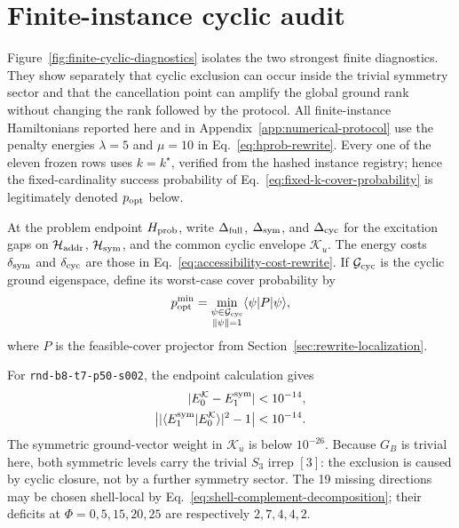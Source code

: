 

\section{Finite-instance cyclic audit}
\label{sec:numerical-reconstruction}

Figure~\ref{fig:finite-cyclic-diagnostics} isolates the two strongest finite
diagnostics.  They show separately that cyclic exclusion can occur inside
the trivial symmetry sector and that the cancellation point can amplify the
global ground rank without changing the rank followed by the protocol.
All finite-instance Hamiltonians reported here and in
Appendix~\ref{app:numerical-protocol} use the penalty energies $\lambda=5$
and $\mu=10$ in
Eq.~\eqref{eq:hprob-rewrite}.  Every one of the eleven frozen rows uses
$k=k^\star$, verified from the hashed instance registry; hence the
fixed-cardinality success probability of
Eq.~\eqref{eq:fixed-k-cover-probability} is legitimately denoted
$p_{\rm opt}$ below.

At the problem endpoint $H_{\rm prob}$, write $\Delta_{\rm full}$,
$\Delta_{\rm sym}$, and $\Delta_{\rm cyc}$ for the excitation gaps on
$\mathcal H_{\rm addr}$, $\mathcal H_{\rm sym}$, and the common cyclic
envelope $\mathcal K_u$.
The energy costs $\delta_{\rm sym}$ and $\delta_{\rm cyc}$ are those in
Eq.~\eqref{eq:accessibility-cost-rewrite}.  If $\mathcal G_{\rm cyc}$ is
the cyclic ground eigenspace, define its worst-case cover probability by
\begin{equation}
 p_{\rm opt}^{\min}
 =\min_{\substack{\psi\in\mathcal G_{\rm cyc}\\\|\psi\|=1}}
 \langle\psi|P|\psi\rangle,
\end{equation}
where $P$ is the feasible-cover projector from
Section~\ref{sec:rewrite-localization}.

For \texttt{rnd-b8-t7-p50-s002}, the endpoint calculation gives
\begin{equation}
 \begin{aligned}
 |E_0^{\mathcal K}-E_1^{\rm sym}|&<10^{-14},\\
 \left||\langle E_1^{\rm sym}|E_0^{\mathcal K}\rangle|^2-1\right|
 &<10^{-14}.
 \end{aligned}
 \label{eq:cyclic-ground-first-symmetric-excitation}
\end{equation}
The symmetric ground-vector weight in $\mathcal K_u$ is below
$10^{-26}$.  Because $G_B$ is trivial here, both symmetric levels
carry the trivial $S_3$ irrep $[3]$: the exclusion is caused by cyclic
closure, not by a further symmetry sector.  The 19 missing directions may
be chosen shell-local by Eq.~\eqref{eq:shell-complement-decomposition};
their deficits at $\Phi=0,5,15,20,25$ are respectively $2,7,4,4,2$.

